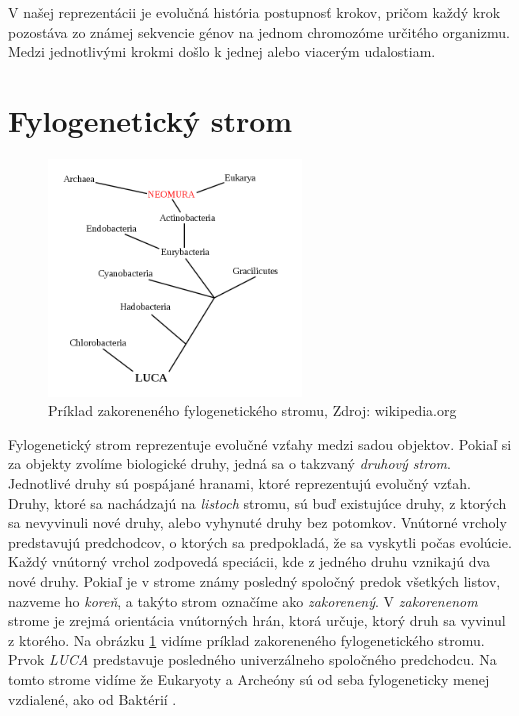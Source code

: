 V našej reprezentácii je evolučná história postupnosť krokov, pričom každý krok pozostáva zo známej sekvencie génov na jednom chromozóme určitého organizmu.
Medzi jednotlivými krokmi došlo k jednej alebo viacerým udalostiam. 

\section{Fylogenetický strom}

\begin{figure}[h]
 \centering
\includegraphics[width=0.6\textwidth]{images/rooted}
\caption{Príklad zakoreneného fylogenetického stromu, Zdroj:  wikipedia.org}\label{obr:rooted}
\end{figure}

Fylogenetický strom reprezentuje evolučné vzťahy medzi sadou objektov. Pokiaľ si za objekty zvolíme biologické druhy, jedná sa o takzvaný \emph{druhový strom}.
Jednotlivé druhy sú pospájané hranami, ktoré reprezentujú evolučný vzťah.
Druhy, ktoré sa nachádzajú na \emph{listoch} stromu, sú buď existujúce druhy, z ktorých sa nevyvinuli nové druhy, alebo vyhynuté druhy bez potomkov.  
Vnútorné vrcholy predstavujú predchodcov, o ktorých sa predpokladá, že sa vyskytli počas evolúcie. 
Každý vnútorný vrchol zodpovedá speciácii, kde z jedného druhu vznikajú dva nové druhy.
Pokiaľ je v strome známy posledný spoločný predok všetkých listov, nazveme ho \emph{koreň}, a takýto strom označíme ako \emph{zakorenený}.
V \emph{zakorenenom} strome je zrejmá orientácia vnútorných hrán, ktorá určuje, ktorý druh sa vyvinul z ktorého.
Na obrázku \ref{obr:rooted} vidíme príklad zakoreneného fylogenetického stromu. Prvok \emph{LUCA} predstavuje posledného univerzálneho spoločného predchodcu.
Na tomto strome vidíme že Eukaryoty a Archeóny sú od seba fylogeneticky menej vzdialené, ako od Baktérií \cite{wiki:phylo}.


